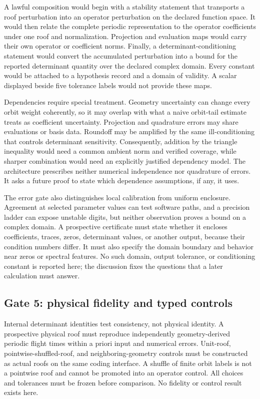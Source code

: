 \documentclass[11pt,a4paper]{article}
\begin{document}
A lawful composition would begin with a stability statement that transports a roof perturbation into an operator perturbation on the declared function space. It would then relate the complete periodic representation to the operator coefficients under one roof and normalization. Projection and evaluation maps would carry their own operator or coefficient norms. Finally, a determinant-conditioning statement would convert the accumulated perturbation into a bound for the reported determinant quantity over the declared complex domain. Every constant would be attached to a hypothesis record and a domain of validity. A scalar displayed beside five tolerance labels would not provide these maps.

Dependencies require special treatment. Geometry uncertainty can change every orbit weight coherently, so it may overlap with what a naive orbit-tail estimate treats as coefficient uncertainty. Projection and quadrature errors may share evaluations or basis data. Roundoff may be amplified by the same ill-conditioning that controls determinant sensitivity. Consequently, addition by the triangle inequality would need a common ambient norm and verified coverage, while sharper combination would need an explicitly justified dependency model. The architecture prescribes neither numerical independence nor quadrature of errors. It asks a future proof to state which dependence assumptions, if any, it uses.

The error gate also distinguishes local calibration from uniform enclosure. Agreement at selected parameter values can test software paths, and a precision ladder can expose unstable digits, but neither observation proves a bound on a complex domain. A prospective certificate must state whether it encloses coefficients, traces, zeros, determinant values, or another output, because their condition numbers differ. It must also specify the domain boundary and behavior near zeros or spectral features. No such domain, output tolerance, or conditioning constant is reported here; the discussion fixes the questions that a later calculation must answer.

\subsection{Gate 5: physical fidelity and typed controls}

Internal determinant identities test consistency, not physical identity. A prospective physical roof must reproduce independently geometry-derived periodic flight times within a priori input and numerical errors. Unit-roof, pointwise-shuffled-roof, and neighboring-geometry controls must be constructed as actual roofs on the same coding interface. A shuffle of finite orbit labels is not a pointwise roof and cannot be promoted into an operator control. All choices and tolerances must be frozen before comparison. No fidelity or control result exists here.
\end{document}
